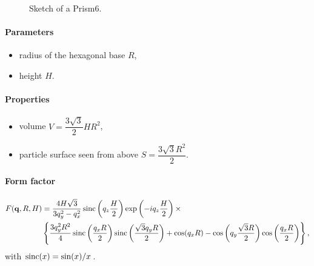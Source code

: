 \begin{figure}[ht]
\hfill
{}
\hfill
{}
\hfill
\caption{Sketch of a Prism6.}
\label{fig:prism6}
\end{figure}

\FloatBarrier

\paragraph{Parameters}
\begin{itemize}
\item radius of the hexagonal base $R$,
\item height $H$.
\end{itemize}

\paragraph{Properties}
\begin{itemize}
\item volume $V = \dfrac{3\sqrt{3}}{2}H R^2$,
\item particle surface seen from above $S =\dfrac{3\sqrt{3}R^2}{2}$.
\end{itemize}

\paragraph{Form factor}
\begin{align*}
F(\mathbf{q}, R, H) &= \frac{4H\sqrt{3}}{3q_y^2 - q_x^2}
\operatorname{sinc}\left(q_z\frac{H}{2}\right) \exp\left(-i q_z\frac{ H}{2}\right)\times\\
&\left\{\frac{3q_y^2R^2}{4} \operatorname{sinc}\left(\frac{q_x
  R}{2}\right)\operatorname{sinc}\left(\frac{\sqrt{3}q_yR }{2}\right)+ \cos(q_x R)-\cos\left(q_y
\frac{\sqrt{3}R}{2}\right) \cos\left(\frac{q_x R}{2}\right)\right\},
\end{align*}
with $\operatorname{sinc}(x)=\sin(x)/x$.

